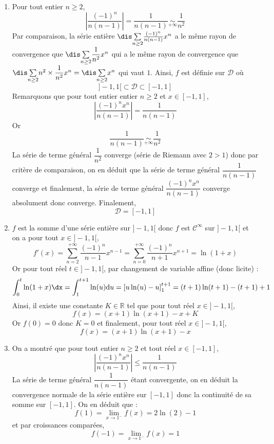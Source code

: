\documentclass[a4paper,10pt]{report}
\newcommand{\Sum}[2]{\ensuremath{\textstyle{\sum\limits_{#1}^{#2}}}}
\begin{document}
  
  
  \begin{enumerate}
  \item Pour tout entier $n \geq 2$,
  $$ \left\vert \frac{( - 1)^{n}}{n(n - 1)} \right\vert = \dfrac{1}{n(n-1)} \underset{+ \infty}{\sim} \dfrac{1}{n^2}$$
Par comparaison, la série entière $\dis \Sum{n \geq 2}{} \frac{( - 1)^{n}}{n(n - 1)}x^{n}$ a le même rayon de convergence que $\dis \Sum{n \geq 2}{} \dfrac{1}{n^2}x^{n}$ qui a le même rayon de convergence que $\dis \Sum{n \geq 2}{} n^2 \times \dfrac{1}{n^2} x^{n} = \dis \Sum{n \geq 2}{} x^n$ qui vaut $1$. Ainsi, $f$ est définie sur $\mathcal{D}$ où
$$ ]-1,1[ \subset \mathcal{D} \subset [-1,1]$$
Remarquons que pour tout entier entier $n \geq 2$ et $x \in [-1,1]$,
$$ \left\vert \dfrac{(-1)^n x^n }{n(n-1)} \right\vert = \dfrac{1}{n(n-1)} $$
Or 
$$ \dfrac{1}{n(n-1)} \underset{+ \infty}{\sim} \dfrac{1}{n^2}$$
La série de terme général $\dfrac{1}{n^2}$ converge (série de Riemann avec $2>1$) donc par critère de comparaison, on en déduit que la série de terme général $\dfrac{1}{n(n-1)}$ converge et finalement, la série de terme général $ \dfrac{(-1)^n x^n }{n(n-1)}$ converge absolument donc converge. Finalement,
$$ \mathcal{D} = [-1,1]$$
\item $f$ est la somme d'une série entière sur $]-1,1[$ donc $f$ est $\mathcal{C}^{\infty}$ sur $]-1,1[$ et on a pour tout $x \in ]-1,1[$,
$$ f'(x) = \sum_{n=2}^{+ \infty} \dfrac{(-1)^n}{n-1} x^{n-1} =  \sum_{n=0}^{+ \infty} \dfrac{(-1)^{n}}{n+1} x^{n+1} = \ln(1+x)$$
Or pour tout réel $t \in ]-1,1[$, par changement de variable affine (donc licite) :
$$ \int_0^t \ln(1+x) \dx = \int_1^{t+1} \ln(u) \textrm{d}u = \left[ u \ln(u)-u \right]_1^{t+1} = (t+1)\ln(t+1)-(t+1) +1$$
Ainsi, il existe une constante $K \in \mathbb{R}$ tel que pour tout réel $x \in ]-1,1[$,
$$ f(x) = (x+1) \ln(x+1) - x + K$$
Or $f(0)=0$ donc $K=0$ et finalement, 
pour tout réel $x \in ]-1,1[$,
$$ f(x) = (x+1) \ln(x+1) - x $$
  \item On a montré que pour tout entier $n \geq 2$ et tout réel $x \in [-1,1]$,
  $$ \left\vert \frac{( - 1)^{n} x^n}{n(n - 1)} \right\vert \leq \dfrac{1}{n(n-1)}$$
La série de terme général $\dfrac{1}{n(n-1)}$ étant convergente, on en déduit la convergence normale de la série entière sur $[-1,1]$ donc la continuité de sa somme sur $[-1,1]$. On en déduit que :
$$ f(1) = \lim_{x \rightarrow 1^{-}} f(x) =  2 \ln(2)-1$$
et par croissances comparées,
$$ f(-1) = \lim_{x \rightarrow 1^{-}} f(x) =  1$$
  \end{enumerate}
  
\end{document}
